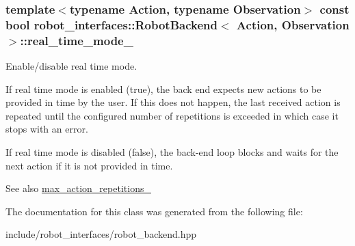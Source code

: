 \subsubsection[{\texorpdfstring{real\+\_\+time\+\_\+mode\+\_\+}{real_time_mode_}}]{\setlength{\rightskip}{0pt plus 5cm}template$<$typename Action, typename Observation$>$ const bool {\bf robot\+\_\+interfaces\+::\+Robot\+Backend}$<$ {\bf Action}, {\bf Observation} $>$\+::real\+\_\+time\+\_\+mode\+\_\+\hspace{0.3cm}{\ttfamily [private]}}\hypertarget{classrobot__interfaces_1_1RobotBackend_a81610183c52c9fe2088304bbd3b6f83f}{}\label{classrobot__interfaces_1_1RobotBackend_a81610183c52c9fe2088304bbd3b6f83f}


Enable/disable real time mode. 

If real time mode is enabled (true), the back end expects new actions to be provided in time by the user. If this does not happen, the last received action is repeated until the configured number of repetitions is exceeded in which case it stops with an error.

If real time mode is disabled (false), the back-\/end loop blocks and waits for the next action if it is not provided in time.

\begin{DoxySeeAlso}{See also}
\hyperlink{classrobot__interfaces_1_1RobotBackend_ae40ecdc44212f79f96d63a84f7b8a6e8}{max\+\_\+action\+\_\+repetitions\+\_\+} 
\end{DoxySeeAlso}


The documentation for this class was generated from the following file\+:\begin{DoxyCompactItemize}
\item 
include/robot\+\_\+interfaces/robot\+\_\+backend.\+hpp\end{DoxyCompactItemize}
